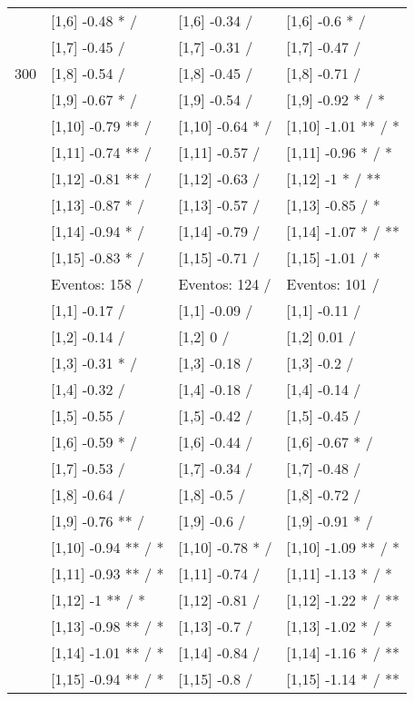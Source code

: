 \begin{table}
\begin{tabular}[t]{llll}
 & {}[1,6] -0.48 * / & {}[1,6] -0.34  / & {}[1,6] -0.6 * /\\
 & {}[1,7] -0.45  / & {}[1,7] -0.31  / & {}[1,7] -0.47  /\\
300 & {}[1,8] -0.54  / & {}[1,8] -0.45  / & {}[1,8] -0.71  /\\
\addlinespace
 & {}[1,9] -0.67 * / & {}[1,9] -0.54  / & {}[1,9] -0.92 * / *\\
 & {}[1,10] -0.79 ** / & {}[1,10] -0.64 * / & {}[1,10] -1.01 ** / *\\
 & {}[1,11] -0.74 ** / & {}[1,11] -0.57  / & {}[1,11] -0.96 * / *\\
 & {}[1,12] -0.81 ** / & {}[1,12] -0.63  / & {}[1,12] -1 * / **\\
 & {}[1,13] -0.87 * / & {}[1,13] -0.57  / & {}[1,13] -0.85  / *\\
\addlinespace
 & {}[1,14] -0.94 * / & {}[1,14] -0.79  / & {}[1,14] -1.07 * / **\\
 & {}[1,15] -0.83 * / & {}[1,15] -0.71  / & {}[1,15] -1.01  / *\\
 & Eventos:  158 / & Eventos:  124 / & Eventos:  101 /\\
 & {}[1,1] -0.17  / & {}[1,1] -0.09  / & {}[1,1] -0.11  /\\
 & {}[1,2] -0.14  / & {}[1,2] 0  / & {}[1,2] 0.01  /\\
\addlinespace
 & {}[1,3] -0.31 * / & {}[1,3] -0.18  / & {}[1,3] -0.2  /\\
 & {}[1,4] -0.32  / & {}[1,4] -0.18  / & {}[1,4] -0.14  /\\
 & {}[1,5] -0.55  / & {}[1,5] -0.42  / & {}[1,5] -0.45  /\\
 & {}[1,6] -0.59 * / & {}[1,6] -0.44  / & {}[1,6] -0.67 * /\\
 & {}[1,7] -0.53  / & {}[1,7] -0.34  / & {}[1,7] -0.48  /\\
\addlinespace
500 & {}[1,8] -0.64  / & {}[1,8] -0.5  / & {}[1,8] -0.72  /\\
 & {}[1,9] -0.76 ** / & {}[1,9] -0.6  / & {}[1,9] -0.91 * /\\
 & {}[1,10] -0.94 ** / * & {}[1,10] -0.78 * / & {}[1,10] -1.09 ** / *\\
 & {}[1,11] -0.93 ** / * & {}[1,11] -0.74  / & {}[1,11] -1.13 * / *\\
 & {}[1,12] -1 ** / * & {}[1,12] -0.81  / & {}[1,12] -1.22 * / **\\
\addlinespace
 & {}[1,13] -0.98 ** / * & {}[1,13] -0.7  / & {}[1,13] -1.02 * / *\\
 & {}[1,14] -1.01 ** / * & {}[1,14] -0.84  / & {}[1,14] -1.16 * / **\\
 & {}[1,15] -0.94 ** / * & {}[1,15] -0.8  / & {}[1,15] -1.14 * / **\\
\bottomrule
\end{tabular}
\end{table}
